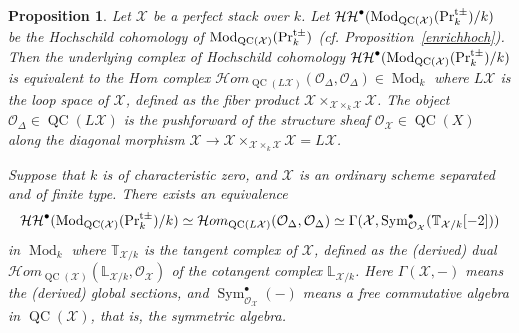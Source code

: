 \documentclass[leqno,12pt]{amsart}
\theoremstyle{plain}
\newtheorem{Proposition}[Theorem]{Proposition}
\theoremstyle{definition}
\newcommand{\HH}{\operatorname{\mathcal{HH}}}
\newcommand{\PRTTT}{\textup{Pr}^{\textup{t}\pm}}
\newcommand{\OO}{{\mathcal{O}}}
\newcommand{\Mod}{\operatorname{Mod}}
\newcommand{\QC}{\operatorname{QC}}
\newcommand{\XX}{\mathcal{X}}
\newcommand{\Sym}{\operatorname{Sym}}
\begin{document}
\begin{Proposition}
\label{catsheafhoch}
Let $\XX$ be a perfect stack over $k$.
Let $\HH^\bullet(\Mod_{\QC(\mathcal{X})}(\PRTTT_k)/k)$ be the Hochschild cohomology of $\Mod_{\QC(\mathcal{X})}(\PRTTT_k)$ (cf. Proposition~\ref{enrichhoch}).
Then the underlying complex of Hochschild cohomology $\HH^\bullet(\Mod_{\QC(\mathcal{X})}(\PRTTT_k)/k)$
is equivalent to the Hom complex $\mathcal{H}om_{\QC(L\XX)}(\OO_{\Delta},\OO_\Delta)\in \Mod_k$
where $L\XX$ is the loop space of $\XX$, defined as the fiber product $\XX\times_{\XX\times_k\XX}\XX$.
The object $\OO_{\Delta}\in \QC(L\XX)$ is the pushforward of the structure sheaf $\OO_{\mathcal{X}}\in \QC(X)$
along the diagonal morphism $\XX\to \XX\times_{\XX\times_k\XX}\XX=L\XX$.

Suppose that $k$ is of characteristic zero, and $\XX$ is an ordinary scheme separated and of finite type.
There exists an equivalence
\[
\HH^\bullet(\Mod_{\QC(\mathcal{X})}(\PRTTT_k)/k)\simeq \mathcal{H}om_{\QC(L\XX)}(\OO_{\Delta},\OO_\Delta)\simeq  \Gamma(\XX,\Sym_{\OO_{\XX}}^{\bullet}(\mathbb{T}_{\XX/k}[-2]))
\]
in $\Mod_k$
where $\mathbb{T}_{\XX/k}$ is the tangent complex of $\XX$, defined as the (derived) dual $\mathcal{H}om_{\QC(\XX)}(\mathbb{L}_{\XX/k},\OO_{\XX})$
of the cotangent complex $\mathbb{L}_{\XX/k}$.
Here $\Gamma(\XX,-)$ means the (derived) global sections, and $\Sym_{\OO_{\XX}}^{\bullet}(-)$ means a free commutative algebra in $\QC(\XX)$, that is, the symmetric algebra.
\end{Proposition}
\end{document}
